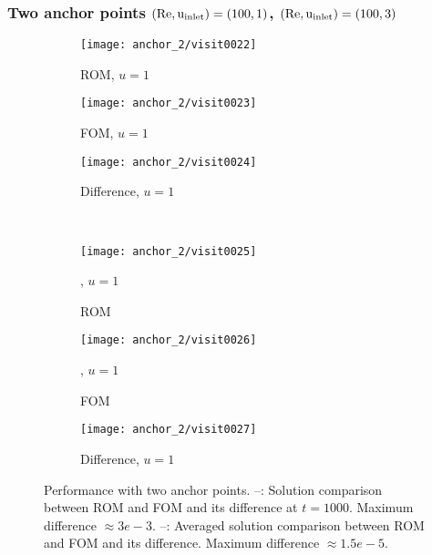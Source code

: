 \subsubsection{Two anchor points $(\rm Re, u_{inlet}) = (100, 1)$, $(\rm Re, u_{inlet}) = (100, 3)$}
\begin{figure}[h!]
     \centering
     \begin{subfigure}[b]{0.3\textwidth}
         \centering
         \texttt{[image: anchor\_2/visit0022]}
         \caption{ROM, $u=1$}
         \label{fig:6_a}
     \end{subfigure}
     \hfill
     \begin{subfigure}[b]{0.3\textwidth}
         \centering
         \texttt{[image: anchor\_2/visit0023]}
         \caption{FOM, $u=1$}
         \label{fig:6_b}
     \end{subfigure}
     \hfill
     \begin{subfigure}[b]{0.3\textwidth}
         \centering
         \texttt{[image: anchor\_2/visit0024]}
         \caption{Difference, $u=1$}
         \label{fig:6_c}
     \end{subfigure}\\
     \begin{subfigure}[b]{0.3\textwidth}
         \centering
         \texttt{[image: anchor\_2/visit0025]}
         \caption{ROM}, $u=1$
         \label{fig:6_d}
     \end{subfigure}
     \hfill
     \begin{subfigure}[b]{0.3\textwidth}
         \centering
         \texttt{[image: anchor\_2/visit0026]}
         \caption{FOM}, $u=1$
         \label{fig:6_e}
     \end{subfigure}
     \hfill
     \begin{subfigure}[b]{0.3\textwidth}
         \centering
         \texttt{[image: anchor\_2/visit0027]}
         \caption{Difference, $u=1$}
         \label{fig:6_f}
     \end{subfigure} 
     \caption{Performance with two anchor points. --: Solution
     comparison between ROM and FOM and its difference at $t=1000$. Maximum
     difference $\approx 3e-3$.  --: Averaged
     solution comparison between ROM and FOM and its difference. Maximum
     difference $\approx 1.5e-5$.}
      \label{fig:6}
\end{figure}
